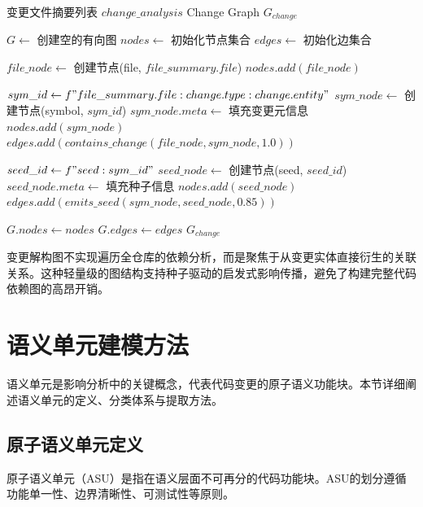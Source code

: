 \begin{algorithm}[htbp]
\caption{变更解构图构建算法}
\label{alg:change_graph_construction}
\begin{algorithmic}[1]
\REQUIRE 变更文件摘要列表 $change\_analysis$
\ENSURE Change Graph $G_{change}$

\STATE $G \leftarrow$ 创建空的有向图
\STATE $nodes \leftarrow$ 初始化节点集合
\STATE $edges \leftarrow$ 初始化边集合

    \STATE $file\_node \leftarrow$ 创建节点(file, $file\_summary.file$)
    \STATE $nodes.add(file\_node)$

        \STATE $sym\_id \leftarrow f"{file\_summary.file}:{change.type}:{change.entity}"$
        \STATE $sym\_node \leftarrow$ 创建节点(symbol, $sym\_id$)
        \STATE $sym\_node.meta \leftarrow$ 填充变更元信息
        \STATE $nodes.add(sym\_node)$
        \STATE $edges.add(contains\_change(file\_node, sym\_node, 1.0))$

            \STATE $seed\_id \leftarrow f"seed:{sym\_id}"$
            \STATE $seed\_node \leftarrow$ 创建节点(seed, $seed\_id$)
            \STATE $seed\_node.meta \leftarrow$ 填充种子信息
            \STATE $nodes.add(seed\_node)$
            \STATE $edges.add(emits\_seed(sym\_node, seed\_node, 0.85))$
        \ENDFOR
    \ENDFOR
\ENDFOR

\STATE $G.nodes \leftarrow nodes$
\STATE $G.edges \leftarrow edges$
\RETURN $G_{change}$
\end{algorithmic}
\end{algorithm}

变更解构图不实现遍历全仓库的依赖分析，而是聚焦于从变更实体直接衍生的关联关系。这种轻量级的图结构支持种子驱动的启发式影响传播，避免了构建完整代码依赖图的高昂开销。

\section{语义单元建模方法}
语义单元是影响分析中的关键概念，代表代码变更的原子语义功能块。本节详细阐述语义单元的定义、分类体系与提取方法。

\subsection{原子语义单元定义}
原子语义单元（ASU）是指在语义层面不可再分的代码功能块。ASU的划分遵循功能单一性、边界清晰性、可测试性等原则。

